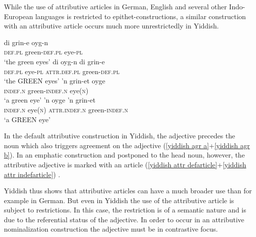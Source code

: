 While the use of attributive articles in German, English and several other Indo-European languages is restricted to epithet-constructions, a similar construction with an attributive article occurs much more unrestrictedly in Yiddish.
\begin{exe}
\ex
{}\label{yiddish attr appos}
\begin{xlist}
\ex 
\gll 	di grin-e oyg-n\\
	\textsc{def.pl}	green-\textsc{def.pl} eye-\textsc{pl}\\
\glt	‘the green eyes’\label{yiddish agr a}
\ex
\gll 	di oyg-n di grin-e\\
	\textsc{def.pl} eye-\textsc{pl} \textsc{attr.def.pl} green-\textsc{def.pl}\\
\glt	‘the GREEN eyes’\label{yiddish attr defarticle}
\ex	
\gll	'n grin-et oyge\\
	\textsc{indef.n} green-\textsc{indef.n} eye(\textsc{n})\\
\glt	‘a green eye’\label{yiddish agr b}
\ex	
\gll	'n oyge 'n grin-et\\
	\textsc{indef.n} eye(\textsc{n}) \textsc{attr.indef.n} green-\textsc{indef.n}\\
\glt	‘a GREEN eye’\label{yiddish attr indefarticle}
\end{xlist}
\end{exe}
In the default attributive construction in Yiddish, the adjective precedes the noun which also triggers agreement on the adjective (\ref{yiddish agr a}+\ref{yiddish agr b}). In an emphatic construction and postponed to the head noun, however, the attributive adjective is marked with an article (\ref{yiddish attr defarticle}+\ref{yiddish attr indefarticle}) \citep[342–347]{plank2003}.

Yiddish thus shows that attributive articles can have a much broader use than for example in German. But even in Yiddish the use of the attributive article is subject to restrictions. In this case, the restriction is of a semantic nature and is due to the referential status of the adjective. In order to occur in an attributive nominalization construction the adjective must be in contrastive focus.

